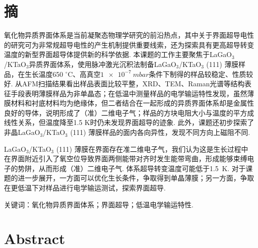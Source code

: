 \documentclass[12pt,a4paper,openany,twoside,UTF-8]{book}
\begin{document}
\setlength{\baselineskip}{20pt} 
\begin{spacing}{1.5}

\end{spacing}


\begin{titlepage}	



\end{titlepage}


\tableofcontents

\listoffigures


\chapter*{摘}
\setcounter{page}{1}

氧化物异质界面体系是当前凝聚态物理学研究的前沿热点，其中关于界面超导电性的研究可为非常规超导电性的产生机制提供重要线索，还为探索具有更高超导转变温度的新型界面超导体提供新的科学依据. 本课题的工作主要聚焦于LaGaO$_3$/KTaO$_3$异质界面体系，使用脉冲激光沉积法制备LaGaO$_3$/KTaO$_3$ (111) 薄膜样品，在生长温度650 $^\circ$C、高真空$\SI{1e-7}{mbar}$条件下制得的样品较稳定、性质较好. 从AFM扫描结果看出样品表面比较平整，XRD、TEM、Raman光谱等结构表征手段表明薄膜样品为非单晶态；在低温中测量样品的电学输运特性发现，虽然薄膜材料和衬底材料均为绝缘体，但二者结合在一起形成的异质界面体系却是金属性良好的导体，说明形成了（准）二维电子气；样品的方块电阻大小与温度的平方成线性关系，但温度降至1.5 K时仍未发现界面超导的迹象. 此外，课题还初步探索了非晶LaGaO$_3$/KTaO$_3$ (111) 薄膜样品的面内各向异性，发现不同方向上磁阻不同.

LaGaO$_3$/KTaO$_3$ (111) 薄膜在界面存在准二维电子气，我们认为这是生长过程中在界面附近引入了氧空位导致界面两侧能带对齐时发生能带弯曲，形成能够束缚电子的势阱，从而形成（准）二维电子气. 体系超导转变温度可能低于\SI{1.5}{K}. 对于课题的进一步展开，一方面可以优化生长条件，争取得到单晶薄膜；另一方面，争取在更低温下对样品进行电学输运测试，探索界面超导.


\quad

\textsf{关键词：}氧化物异质界面体系；界面超导；低温电学输运特性.




\chapter*{Abstract}
\end{document}
